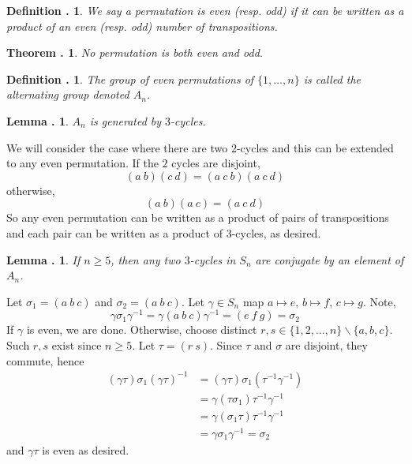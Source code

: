 \documentclass[twoside]{report}
\newcounter{Lecture}
\theoremstyle{myts}
\newcounter{c}[Lecture]
\newtheorem{dfn}[c]{Definition \arabic{Lecture}.}
\newtheorem{thm}[c]{Theorem \arabic{Lecture}.}
\newtheorem{lma}[c]{Lemma \arabic{Lecture}.}
\newcounter{ex}[Lecture]
\newenvironment{prf}{
  \noindent\begin{mdframed}[style=prf]}{\end{mdframed} \vspace{1em}
}
\begin{document}
\begin{dfn}
  We say a permutation is \emph{even} (resp. \emph{odd}) if it can be written as a product of an even (resp. odd) number of transpositions.
\end{dfn}

\begin{thm}
  No permutation is both even and odd.
\end{thm}

\begin{dfn}
  The group of even permutations of \( \{ 1 , \ldots , n \} \) is called the \emph{alternating group} denoted $A_n$.
\end{dfn}

\begin{lma}
  $A_n$ is generated by $3$-cycles.
\end{lma}

\begin{prf}
  We will consider the case where there are two $2$-cycles and this can be extended to any even permutation. If the $2$ cycles are disjoint, 
  \[
    ( a \: b ) ( c \: d ) = ( a \: c \: b ) ( a \: c \: d )
  \]
  otherwise,
  \[
    (a \: b ) ( a \: c ) = ( a \: c \: d)
  \]
  So any even permutation can be written as a product of pairs of transpositions and each pair can be written as a product of $3$-cycles, as desired.
\end{prf}

\begin{lma}
  If \( n \geq 5 \), then any two $3$-cycles in $S_n$ are conjugate by an element of $A_n$.
\end{lma}

\begin{prf}
  Let \( \sigma_1 = (a \: b \: c ) \) and \( \sigma_2 = ( a \: b \: c ) \). Let \( \gamma \in S_n \) map \(a\mapsto e\), \(b\mapsto f\), \(c\mapsto g\). Note,
  \[
    \gamma \sigma_1 \gamma^{-1} = \gamma ( a \: b \: c ) \gamma^{-1} = ( e \: f \: g ) = \sigma_2
  \]
  If $\gamma$ is even, we are done. Otherwise, choose distinct \( r,s \in \{ 1,2, \ldots , n \}\backslash \{ a,b,c\} \). Such $r,s$ exist since $n\geq 5$. Let \( \tau = ( r \: s ) \). Since $\tau$ and $\sigma$ are disjoint, they commute, hence
  \begin{align*}
    (\gamma\tau) \sigma_1 (\gamma\tau)^{-1} &= (\gamma\tau) \sigma_1 (\tau^{-1}\gamma^{-1}) \\
      &= \gamma (\tau\sigma_1) \tau^{-1}\gamma^{-1} \\
      &= \gamma (\sigma_1\tau) \tau^{-1}\gamma^{-1} \\
      &= \gamma \sigma_1 \gamma^{-1} = \sigma_2
  \end{align*}
  and \(\gamma\tau\) is even as desired.
\end{prf}
\end{document}

